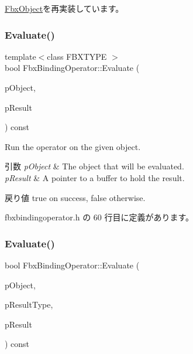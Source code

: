 \hyperlink{class_fbx_object_a123e084d9b32b29c28af6384b7c3c608}{Fbx\+Object}を再実装しています。

\mbox{\label{class_fbx_binding_operator_a1487485be07b04ef755f8831912d2709}} 
\subsubsection{\texorpdfstring{Evaluate()}{Evaluate()}\hspace{0.1cm}{\footnotesize\ttfamily [1/2]}}
{\footnotesize\ttfamily template$<$class F\+B\+X\+T\+Y\+PE $>$ \\
bool Fbx\+Binding\+Operator\+::\+Evaluate (\begin{DoxyParamCaption}\item[{const \hyperlink{class_fbx_object}{Fbx\+Object} $\ast$}]{p\+Object,  }\item[{F\+B\+X\+T\+Y\+PE $\ast$}]{p\+Result }\end{DoxyParamCaption}) const\hspace{0.3cm}{\ttfamily [inline]}}

Run the operator on the given object. 
\begin{DoxyParams}{引数}
{\em p\+Object} & The object that will be evaluated. \\
\hline
{\em p\+Result} & A pointer to a buffer to hold the result. \\
\hline
\end{DoxyParams}
\begin{DoxyReturn}{戻り値}
{\ttfamily true} on success, {\ttfamily false} otherwise. 
\end{DoxyReturn}


 fbxbindingoperator.\+h の 60 行目に定義があります。

\mbox{\label{class_fbx_binding_operator_a46e67c6d662013ae83cd239648d85630}} 
\subsubsection{\texorpdfstring{Evaluate()}{Evaluate()}\hspace{0.1cm}{\footnotesize\ttfamily [2/2]}}
{\footnotesize\ttfamily bool Fbx\+Binding\+Operator\+::\+Evaluate (\begin{DoxyParamCaption}\item[{const \hyperlink{class_fbx_object}{Fbx\+Object} $\ast$}]{p\+Object,  }\item[{\hyperlink{fbxpropertytypes_8h_a73913a5ddfb20e57c6f25e9e6784bd92}{E\+Fbx\+Type} $\ast$}]{p\+Result\+Type,  }\item[{void $\ast$$\ast$}]{p\+Result }\end{DoxyParamCaption}) const\hspace{0.3cm}{\ttfamily [protected]}}

